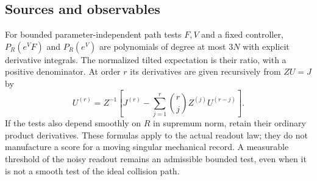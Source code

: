 \subsection{Sources and observables}
For bounded parameter-independent path tests $F,V$ and a fixed controller,
$P_R(e^VF)$ and $P_R(e^V)$ are polynomials of degree at most $3N$ with
explicit derivative integrals. The normalized tilted expectation is their
ratio, with a positive denominator. At order $r$ its derivatives are given
recursively from $ZU=J$ by
\[
 U^{(r)}=Z^{-1}\left[J^{(r)}-
          \sum_{j=1}^r\binom rj Z^{(j)}U^{(r-j)}\right].
\]
If the tests also depend smoothly on $R$ in supremum norm, retain their
ordinary product derivatives. These formulas apply to the actual readout
law; they do not manufacture a score for a moving singular mechanical
record. A measurable threshold of the noisy readout remains an admissible
bounded test, even when it is not a smooth test of the ideal collision path.
